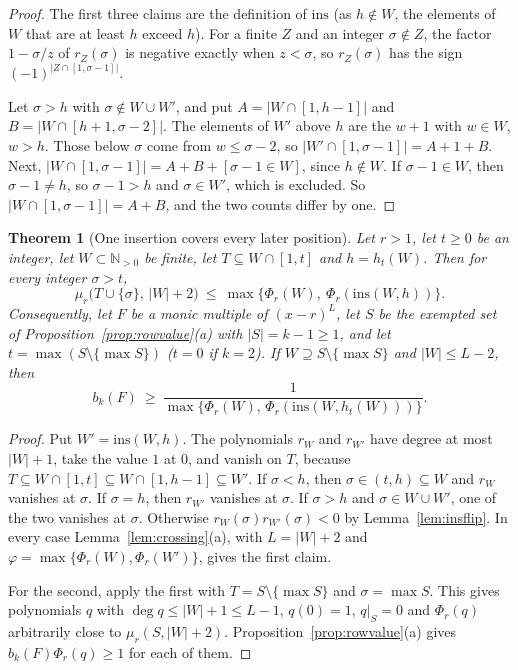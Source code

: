 \documentclass[11pt]{article}
\newtheorem{theorem}{Theorem}[section]
\newcommand{\N}{\mathbb N}
\begin{document}
\begin{proof}
The first three claims are the definition of $\mathrm{ins}$ (as $h\notin W$,
the elements of $W$ that are at least $h$ exceed $h$).  For a finite $Z$ and
an integer $\sigma\notin Z$, the factor $1-\sigma/z$ of $r_Z(\sigma)$ is
negative exactly when $z<\sigma$, so $r_Z(\sigma)$ has the sign
$(-1)^{|Z\cap[1,\sigma-1]|}$.

Let $\sigma>h$ with $\sigma\notin W\cup W'$, and put
$A=|W\cap[1,h-1]|$ and $B=|W\cap[h+1,\sigma-2]|$.  The elements of $W'$
above $h$ are the $w+1$ with $w\in W$, $w>h$.  Those below $\sigma$ come
from $w\le\sigma-2$, so $|W'\cap[1,\sigma-1]|=A+1+B$.  Next,
$|W\cap[1,\sigma-1]|=A+B+[\sigma-1\in W]$, since $h\notin W$.  If
$\sigma-1\in W$, then $\sigma-1\ne h$, so $\sigma-1>h$ and $\sigma\in W'$,
which is excluded.  So $|W\cap[1,\sigma-1]|=A+B$, and the two counts differ
by one.
\end{proof}

\begin{theorem}[One insertion covers every later position]\label{thm:crossing}
Let $r>1$, let $t\ge0$ be an integer, let $W\subset\N_{>0}$ be finite, let
$T\subseteq W\cap[1,t]$ and $h=h_t(W)$.  Then for every integer $\sigma>t$,
\[
  \mu_r\bigl(T\cup\{\sigma\},\,|W|+2\bigr)\ \le\
  \max\bigl\{\Phi_r(W),\ \Phi_r(\mathrm{ins}(W,h))\bigr\}.
\]
Consequently, let $F$ be a monic multiple of $(x-r)^L$, let $S$ be the
exempted set of Proposition~\ref{prop:rowvalue}(a) with $|S|=k-1\ge1$, and
let $t=\max(S\setminus\{\max S\})$ ($t=0$ if $k=2$).  If $W\supseteq S\setminus\{\max S\}$
and $|W|\le L-2$, then
\[
  b_k(F)\ \ge\ \frac1{\max\{\Phi_r(W),\,\Phi_r(\mathrm{ins}(W,h_t(W)))\}} .
\]
\end{theorem}

\begin{proof}
Put $W'=\mathrm{ins}(W,h)$.  The polynomials $r_W$ and $r_{W'}$ have degree
at most $|W|+1$, take the value $1$ at $0$, and vanish on $T$, because
$T\subseteq W\cap[1,t]\subseteq W\cap[1,h-1]\subseteq W'$.  If $\sigma<h$,
then $\sigma\in(t,h)\subseteq W$ and $r_W$ vanishes at $\sigma$.  If
$\sigma=h$, then $r_{W'}$ vanishes at $\sigma$.  If $\sigma>h$ and
$\sigma\in W\cup W'$, one of the two vanishes at $\sigma$.  Otherwise
$r_W(\sigma)r_{W'}(\sigma)<0$ by Lemma~\ref{lem:insflip}.  In every case
Lemma~\ref{lem:crossing}(a), with $L=|W|+2$ and
$\varphi=\max\{\Phi_r(W),\Phi_r(W')\}$, gives the first claim.

For the second, apply the first with $T=S\setminus\{\max S\}$ and
$\sigma=\max S$.  This gives polynomials $q$ with $\deg q\le|W|+1\le L-1$,
$q(0)=1$, $q|_S=0$ and $\Phi_r(q)$ arbitrarily close to
$\mu_r(S,|W|+2)$.  Proposition~\ref{prop:rowvalue}(a) gives
$b_k(F)\Phi_r(q)\ge1$ for each of them.
\end{proof}
\end{document}
